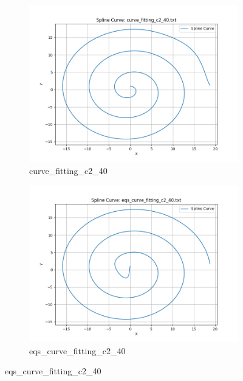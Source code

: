 \documentclass[a4paper]{article}
\begin{document}
\begin{figure}[htbp]
\begin{subfigure}[t]{0.24\textwidth}
      \includegraphics[width=\textwidth]{figures/E/curve_fitting_c2_40.png}
      \caption*{curve\_fitting\_c2\_40}
  \end{subfigure}
  \begin{subfigure}[t]{0.24\textwidth}
      \centering
      \includegraphics[width=\textwidth]{figures/E/eqs_curve_fitting_c2_40.png}
      \caption*{eqs\_curve\_fitting\_c2\_40}
  \end{subfigure}


\end{figure}
\end{document}
